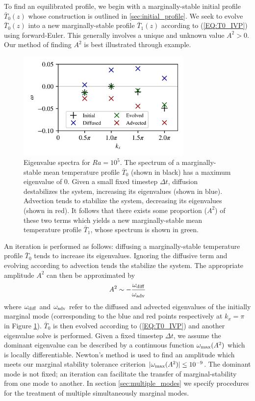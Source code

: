 \documentclass[reprint,amsmath,amssymb,aps]{revtex4-1}
\begin{document}
\par To find an equilibrated profile, we begin with a marginally-stable initial profile $\bar{T}_0(z)$ whose construction is outlined in \ref{sec:initial_profile}. We seek to evolve $\bar{T}_0(z)$ into a new marginally-stable profile $\bar{T}_1(z)$ according to (\ref{EQ:T0_IVP}) using forward-Euler. This generally involves a unique and unknown value $A^2 > 0$. Our method of finding $A^2$ is best illustrated through example.

\begin{figure}[h]
    \includegraphics[width=3.4in]{EV_spectrum_ol.png}
    \caption{Eigenvalue spectra for $Ra = 10^5$. The spectrum of a marginally-stable mean temperature profile $\bar{T}_0$ (shown in black) has a maximum eigenvalue of 0. Given a small fixed timestep $\Delta t$, diffusion destabilizes the system, increasing its eigenvalues (shown in blue). Advection tends to stabilize the system, decreasing its eigenvalues (shown in red). It follows that there exists some proportion ($A^2$) of these two terms which yields a new marginally-stable mean temperature profile $\bar{T}_1$, whose spectrum is shown in green.}
    \label{fig:iteration_spectra} 
\end{figure}

An iteration is performed as follows: diffusing a marginally-stable temperature profile $\bar{T}_0$ tends to increase its eigenvalues. Ignoring the diffusive term and evolving according to advection tends the stabilize the system. The appropriate amplitude $A^2$ can then be approximated by
\begin{equation}
    A^2 \sim -\frac{\omega_{\rm{diff}}}{\omega_{\rm{adv}}}
\end{equation}
where $\omega_{\rm{diff}}$ and $\omega_{\rm{adv}}$ refer to the diffused and advected eigenvalues of the initially marginal mode (corresponding to the blue and red points respectively at $k_x = \pi$ in Figure \ref{fig:iteration_spectra}). $\bar{T}_0$ is then evolved according to (\ref{EQ:T0_IVP}) and another eigenvalue solve is performed. Given a fixed timestep $\Delta t$, we assume the dominant eigenvalue can be described by a continuous function $\omega_{\rm{max}} (A^2)$ which is locally differentiable. Newton's method is used to find an amplitude which meets our marginal stability tolerance criterion $|\omega_{\rm{max}} (A^2)| \leq 10^{-9}$. The dominant mode is not fixed; an iteration can facilitate the transfer of marginal-stability from one mode to another. In section \ref{sec:multiple_modes} we specify procedures for the treatment of multiple simultaneously marginal modes.
\end{document}
